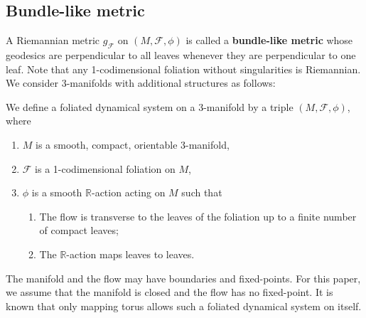     \subsection{Bundle-like metric}
    A Riemannian metric $g_{\mathcal{F}}$ on $(M,\mathcal{F},\phi)$ is called a \textbf{bundle-like metric} whose geodesics are perpendicular to all leaves whenever they are perpendicular to one leaf.
    Note that any 1-codimensional foliation without singularities is Riemannian.\\
    

We consider 3-manifolds with additional structures as follows:
\begin{definition}
We define a foliated dynamical system on a 3-manifold by a triple $(M,\mathcal{F},\phi)$, where
\begin{enumerate}
    \item $M$ is a smooth, compact, orientable 3-manifold,
    \item $\mathcal{F}$ is a 1-codimensional foliation on $M$,
    \item $\phi$ is a smooth $\mathbb{R}$-action acting on $M$ such that
    \begin{enumerate}
        \item The flow is transverse to the leaves of the foliation up to a finite number of compact leaves;
        \item The $\mathbb{R}$-action maps leaves to leaves.
    \end{enumerate}
\end{enumerate}
\end{definition}
The manifold and the flow may have boundaries and fixed-points.
For this paper, we assume that the manifold is closed and the flow has no fixed-point.
It is known that only mapping torus allows such a foliated dynamical system on itself.